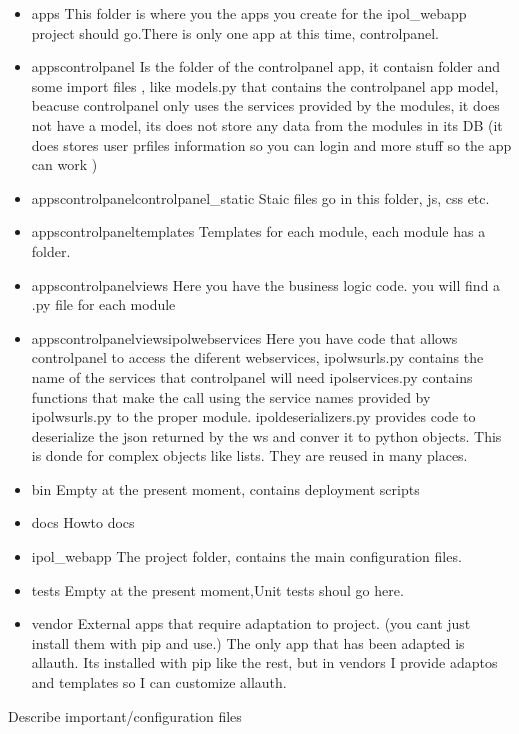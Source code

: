 \begin{itemize}
\item  apps
This folder is where you the apps you create for the ipol\_webapp project should go.There is only one app at this time, controlpanel.
\item  apps\/controlpanel
Is the folder of the controlpanel app, it contaisn folder and some import files , like models.py that contains the controlpanel app model, beacuse controlpanel only uses the services provided by the modules, it does not have a model, its does not store any data from the modules in its DB (it does stores user prfiles information so you can login and more stuff so the app can work )
\item  apps\/controlpanel\/controlpanel\_static
Staic files go in this folder, js, css etc.
\item  apps\/controlpanel\/templates
Templates for each module, each module has a folder.
\item  apps\/controlpanel\/views
Here you have the business logic code. you will find a .py file for each module
\item  apps\/controlpanel\/views\/ipolwebservices
Here you have code that allows controlpanel to access the diferent webservices, 
ipolwsurls.py contains the name of the services that controlpanel will need
ipolservices.py contains functions that make the call using the service names provided by ipolwsurls.py to the proper module.
ipoldeserializers.py provides code to deserialize the json returned by the ws and conver it to python objects. This is donde for complex objects like lists. They are reused in many places. 
\item  bin
Empty at the present moment, contains deployment scripts
\item  docs
Howto docs
\item  ipol\_webapp
The project folder, contains the main configuration files.
\item  tests
Empty at the present moment,Unit tests shoul go here.
\item  vendor
External apps that require adaptation to project. (you cant just install them with pip and use.)
The only app that has been adapted is allauth. Its installed with pip like the rest, but in vendors I provide adaptos and templates so I can customize allauth.
\end{itemize}

Describe important/configuration files

